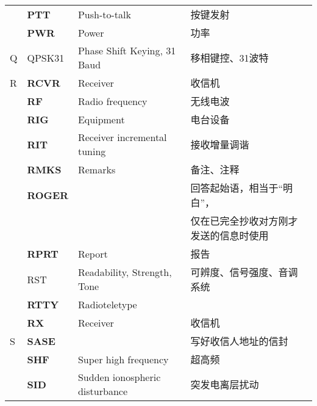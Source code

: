 \begin{longtable}[l]{llll}
    & \textbf{PTT}                      & Push-to-talk                            & 按键发射                \\
    & \textbf{PWR}                      & Power                                   & 功率                  \\
  Q & QPSK31                            & Phase Shift Keying, 31 Baud             & 移相键控、31波特           \\
  R & \textbf{RCVR}                     & Receiver                                & 收信机                 \\
    & \textbf{RF}                       & Radio frequency                         & 无线电波                \\
    & \textbf{RIG}                      & Equipment                               & 电台设备                \\
    & \textbf{RIT}                      & Receiver incremental tuning             & 接收增量调谐              \\
    & \textbf{RMKS}                     & Remarks                                 & 备注、注释               \\
    & \textbf{ROGER}                    &                                         & 回答起始语，相当于“明白”，      \\
    &                                   &                                         & 仅在已完全抄收对方刚才发送的信息时使用 \\
    & \textbf{RPRT}                     & Report                                  & 报告                  \\
    & RST                               & Readability, Strength, Tone             & 可辨度、信号强度、音调系统       \\
    & \textbf{RTTY}                     & Radioteletype                           &                     \\
    & \textbf{RX}                       & Receiver                                & 收信机                 \\
  S & \textbf{SASE}                     &                                         & 写好收信人地址的信封          \\
    & \textbf{SHF}                      & Super high frequency                    & 超高频                 \\
    & \textbf{SID}                      & Sudden ionospheric disturbance          & 突发电离层扰动             \\

\end{longtable}
